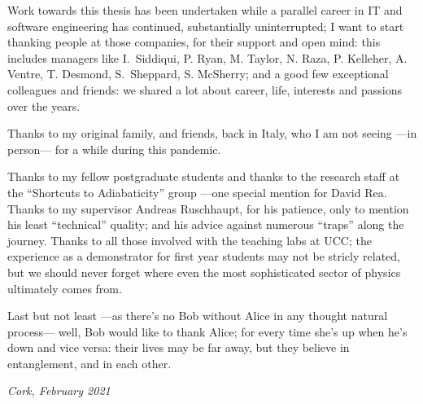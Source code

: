 {
\small
Work towards this thesis has been undertaken while a parallel career
in IT and software engineering has continued,
substantially uninterrupted;
I want to start thanking people at those companies, for their support and open mind:
this includes managers like
I.~Siddiqui, P. Ryan, M. Taylor, N. Raza, P. Kelleher, A. Ventre, T. Desmond, S.~Sheppard, S. McSherry;
and a good few exceptional colleagues and friends: we shared a lot about career, life, interests and passions over the years.

Thanks to my original family, and friends, back in Italy,
who I am not seeing ---in person--- for a while during this pandemic.

Thanks to my fellow postgraduate students
and thanks to the research staff
at the ``Shortcuts to Adiabaticity'' group
---one special mention for David Rea.
Thanks to my supervisor Andreas Ruschhaupt, for his patience,
only to mention his least ``technical'' quality;
and his advice against numerous ``traps'' along the journey.
Thanks to all those involved with the teaching labs at UCC;
the  experience as a demonstrator for first year students may not be stricly related,
but we should never forget where even the most sophisticated sector of physics
ultimately comes from.

Last but not least ---as there's no Bob without Alice in any thought natural process---
well, Bob would like to thank Alice;
for every time she’s up when he’s down and vice versa:
their lives may be far away, but they believe in entanglement, and in each other.

\textit{Cork, February 2021}
}
